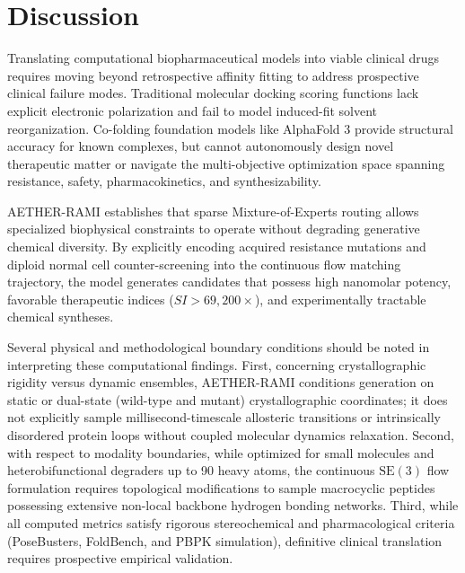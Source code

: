 \documentclass[11pt,a4paper]{article}
\begin{document}
\section*{Discussion}
Translating computational biopharmaceutical models into viable clinical drugs requires moving beyond retrospective affinity fitting to address prospective clinical failure modes. Traditional molecular docking scoring functions lack explicit electronic polarization and fail to model induced-fit solvent reorganization. Co-folding foundation models like AlphaFold 3 provide structural accuracy for known complexes, but cannot autonomously design novel therapeutic matter or navigate the multi-objective optimization space spanning resistance, safety, pharmacokinetics, and synthesizability.

AETHER-RAMI establishes that sparse Mixture-of-Experts routing allows specialized biophysical constraints to operate without degrading generative chemical diversity. By explicitly encoding acquired resistance mutations and diploid normal cell counter-screening into the continuous flow matching trajectory, the model generates candidates that possess high nanomolar potency, favorable therapeutic indices ($SI > 69,200\times$), and experimentally tractable chemical syntheses.

Several physical and methodological boundary conditions should be noted in interpreting these computational findings. First, concerning crystallographic rigidity versus dynamic ensembles, AETHER-RAMI conditions generation on static or dual-state (wild-type and mutant) crystallographic coordinates; it does not explicitly sample millisecond-timescale allosteric transitions or intrinsically disordered protein loops without coupled molecular dynamics relaxation. Second, with respect to modality boundaries, while optimized for small molecules and heterobifunctional degraders up to 90 heavy atoms, the continuous $\mathrm{SE}(3)$ flow formulation requires topological modifications to sample macrocyclic peptides possessing extensive non-local backbone hydrogen bonding networks. Third, while all computed metrics satisfy rigorous stereochemical and pharmacological criteria (PoseBusters, FoldBench, and PBPK simulation), definitive clinical translation requires prospective empirical validation. 
\end{document}
